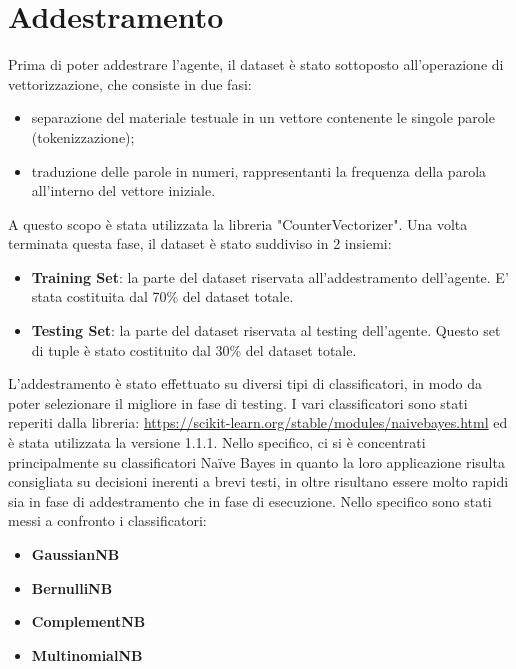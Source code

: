 \documentclass{report}
\begin{document}
    \section{Addestramento}
    Prima di poter addestrare l'agente, il dataset è stato sottoposto all'operazione di vettorizzazione, che consiste in due fasi:
    \begin{itemize}
        \item separazione del materiale testuale in un vettore contenente le singole parole (tokenizzazione);
        \item traduzione delle parole in numeri, rappresentanti la frequenza della parola all'interno del vettore iniziale.
    \end{itemize}
    A questo scopo è stata utilizzata la libreria "CounterVectorizer".
    \newline
    Una volta terminata questa fase, il dataset è stato suddiviso in 2 insiemi:
    \begin{itemize}
        \item {\bfseries Training Set}: la parte del dataset riservata all'addestramento dell'agente. E' stata costituita dal 
        70\% del dataset totale.
        \item {\bfseries Testing Set}: la parte del dataset riservata al testing dell'agente. Questo set di tuple è stato 
        costituito dal 30\% del dataset totale.
    \end{itemize}
    L'addestramento è stato effettuato su diversi tipi di classificatori, in modo da poter selezionare il migliore in fase di testing.
    I vari classificatori sono stati reperiti dalla libreria: \href{https://scikit-learn.org/stable/modules/naive_bayes.html}{https://scikit-learn.org/stable/modules/naive\textunderscore bayes.html}
    ed è stata utilizzata la versione 1.1.1.
    Nello specifico, ci si è concentrati principalmente su classificatori Naïve Bayes in quanto la loro applicazione risulta consigliata
    su decisioni inerenti a brevi testi, in oltre risultano essere molto rapidi sia in fase di addestramento che in fase di esecuzione.
    Nello specifico sono stati messi a confronto i classificatori:
    \begin{itemize}
        \item {\bfseries GaussianNB}
        \item {\bfseries BernulliNB}
        \item {\bfseries ComplementNB}
        \item {\bfseries MultinomialNB}
    \end{itemize}
\end{document}
